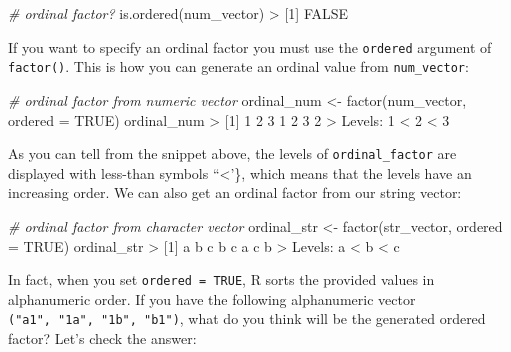 \documentclass[
]{book}
\newenvironment{Shaded}{\begin{snugshade}}{\end{snugshade}}
\newcommand{\AttributeTok}[1]{\textcolor[rgb]{0.77,0.63,0.00}{#1}}
\newcommand{\CommentTok}[1]{\textcolor[rgb]{0.56,0.35,0.01}{\textit{#1}}}
\newcommand{\ConstantTok}[1]{\textcolor[rgb]{0.00,0.00,0.00}{#1}}
\newcommand{\DecValTok}[1]{\textcolor[rgb]{0.00,0.00,0.81}{#1}}
\newcommand{\FunctionTok}[1]{\textcolor[rgb]{0.00,0.00,0.00}{#1}}
\newcommand{\NormalTok}[1]{#1}
\newcommand{\OtherTok}[1]{\textcolor[rgb]{0.56,0.35,0.01}{#1}}
\newcommand{\SpecialCharTok}[1]{\textcolor[rgb]{0.00,0.00,0.00}{#1}}
\begin{document}
\begin{Shaded}
\begin{Highlighting}[]
\CommentTok{\# ordinal factor?}
\FunctionTok{is.ordered}\NormalTok{(num\_vector)}
\SpecialCharTok{\textgreater{}}\NormalTok{ [}\DecValTok{1}\NormalTok{] }\ConstantTok{FALSE}
\end{Highlighting}
\end{Shaded}

If you want to specify an ordinal factor you must use the \texttt{ordered} argument of
\texttt{factor()}. This is how you can generate an ordinal value from \texttt{num\_vector}:

\begin{Shaded}
\begin{Highlighting}[]
\CommentTok{\# ordinal factor from numeric vector}
\NormalTok{ordinal\_num }\OtherTok{\textless{}{-}} \FunctionTok{factor}\NormalTok{(num\_vector, }\AttributeTok{ordered =} \ConstantTok{TRUE}\NormalTok{)}
\NormalTok{ordinal\_num}
\SpecialCharTok{\textgreater{}}\NormalTok{ [}\DecValTok{1}\NormalTok{] }\DecValTok{1} \DecValTok{2} \DecValTok{3} \DecValTok{1} \DecValTok{2} \DecValTok{3} \DecValTok{2}
\SpecialCharTok{\textgreater{}}\NormalTok{ Levels}\SpecialCharTok{:} \DecValTok{1} \SpecialCharTok{\textless{}} \DecValTok{2} \SpecialCharTok{\textless{}} \DecValTok{3}
\end{Highlighting}
\end{Shaded}

As you can tell from the snippet above, the levels of \texttt{ordinal\_factor} are
displayed with less-than symbols ``\textless{}'\}, which means that the levels have an
increasing order. We can also get an ordinal factor from our string vector:

\begin{Shaded}
\begin{Highlighting}[]
\CommentTok{\# ordinal factor from character vector}
\NormalTok{ordinal\_str }\OtherTok{\textless{}{-}} \FunctionTok{factor}\NormalTok{(str\_vector, }\AttributeTok{ordered =} \ConstantTok{TRUE}\NormalTok{)}
\NormalTok{ordinal\_str}
\SpecialCharTok{\textgreater{}}\NormalTok{ [}\DecValTok{1}\NormalTok{] a b c b c a c b}
\SpecialCharTok{\textgreater{}}\NormalTok{ Levels}\SpecialCharTok{:}\NormalTok{ a }\SpecialCharTok{\textless{}}\NormalTok{ b }\SpecialCharTok{\textless{}}\NormalTok{ c}
\end{Highlighting}
\end{Shaded}

In fact, when you set \texttt{ordered\ =\ TRUE}, R sorts the provided values in
alphanumeric order. If you have the following alphanumeric vector
\texttt{("a1",\ "1a",\ "1b",\ "b1")}, what do you think will be the generated ordered
factor? Let's check the answer:
\end{document}
